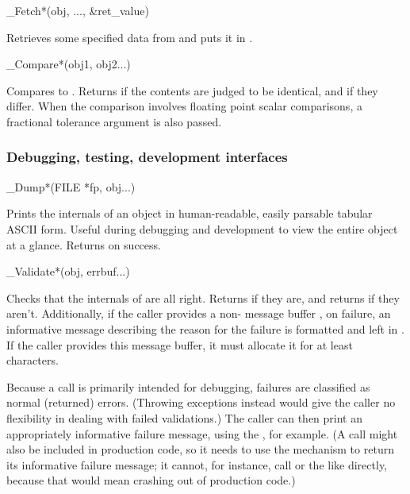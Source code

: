 \begin{sreapi}
\hypertarget{ifc:Fetch}
{\item[\_Fetch*(obj, ..., \&ret\_value)]}

Retrieves some specified data from  and puts it in
.

\hypertarget{ifc:Compare}
{\item[\_Compare*(obj1, obj2...)]}

Compares  to . Returns  if the
contents are judged to be identical, and  if they
differ. When the comparison involves floating point scalar
comparisons, a fractional tolerance argument  is also
passed. 

\end{sreapi}



\subsubsection{Debugging, testing, development interfaces}

\begin{sreapi}
\hypertarget{ifc:Dump}
{\item[\_Dump*(FILE *fp, obj...)]}

Prints the internals of an object in human-readable, easily parsable
tabular ASCII form. Useful during debugging and development to view
the entire object at a glance. Returns  on success.

\hypertarget{ifc:Validate}
{\item[\_Validate*(obj, errbuf...)]}

Checks that the internals of  are all right. Returns
 if they are, and returns  if they
aren't. Additionally, if the caller provides a non-
message buffer , on failure, an informative message
describing the reason for the failure is formatted and left in
. If the caller provides this message buffer, it must
allocate it for at least  characters.

Because a  call is primarily intended for
debugging, failures are classified as normal (returned) errors.
(Throwing exceptions instead would give the caller no flexibility in
dealing with failed validations.) The caller can then print an
appropriately informative failure message, using the ,
for example. (A  call might also be included in
production code, so it needs to use the  mechanism to
return its informative failure message; it cannot, for instance, call
 or the like directly, because that would mean
crashing out of production code.)

\end{sreapi}



